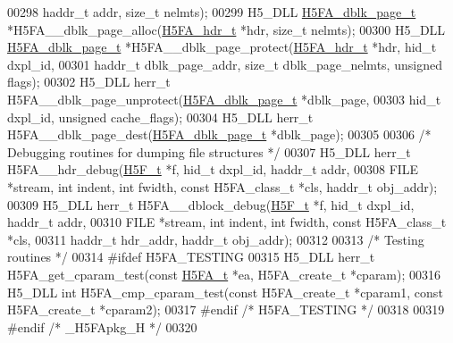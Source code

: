 \begin{DoxyCode}
00298     haddr\_t addr, \textcolor{keywordtype}{size\_t} nelmts);
00299 H5\_DLL \hyperlink{struct_h5_f_a__dbk__page__t}{H5FA\_dblk\_page\_t} *H5FA\_\_dblk\_page\_alloc(\hyperlink{struct_h5_f_a__hdr__t}{H5FA\_hdr\_t} *hdr, \textcolor{keywordtype}{size\_t} nelmts);
00300 H5\_DLL \hyperlink{struct_h5_f_a__dbk__page__t}{H5FA\_dblk\_page\_t} *H5FA\_\_dblk\_page\_protect(\hyperlink{struct_h5_f_a__hdr__t}{H5FA\_hdr\_t} *hdr, hid\_t dxpl\_id,
00301     haddr\_t dblk\_page\_addr, \textcolor{keywordtype}{size\_t} dblk\_page\_nelmts, \textcolor{keywordtype}{unsigned} flags);
00302 H5\_DLL herr\_t H5FA\_\_dblk\_page\_unprotect(\hyperlink{struct_h5_f_a__dbk__page__t}{H5FA\_dblk\_page\_t} *dblk\_page,
00303     hid\_t dxpl\_id, \textcolor{keywordtype}{unsigned} cache\_flags);
00304 H5\_DLL herr\_t H5FA\_\_dblk\_page\_dest(\hyperlink{struct_h5_f_a__dbk__page__t}{H5FA\_dblk\_page\_t} *dblk\_page);
00305 
00306 \textcolor{comment}{/* Debugging routines for dumping file structures */}
00307 H5\_DLL herr\_t H5FA\_\_hdr\_debug(\hyperlink{struct_h5_f__t}{H5F\_t} *f, hid\_t dxpl\_id, haddr\_t addr,
00308     FILE *stream, \textcolor{keywordtype}{int} indent, \textcolor{keywordtype}{int} fwidth, \textcolor{keyword}{const} H5FA\_class\_t *cls, haddr\_t obj\_addr);
00309 H5\_DLL herr\_t H5FA\_\_dblock\_debug(\hyperlink{struct_h5_f__t}{H5F\_t} *f, hid\_t dxpl\_id, haddr\_t addr,
00310     FILE *stream, \textcolor{keywordtype}{int} indent, \textcolor{keywordtype}{int} fwidth, \textcolor{keyword}{const} H5FA\_class\_t *cls,
00311     haddr\_t hdr\_addr, haddr\_t obj\_addr);
00312 
00313 \textcolor{comment}{/* Testing routines */}
00314 \textcolor{preprocessor}{#ifdef H5FA\_TESTING}
00315 H5\_DLL herr\_t H5FA\_get\_cparam\_test(\textcolor{keyword}{const} \hyperlink{struct_h5_f_a__t}{H5FA\_t} *ea, H5FA\_create\_t *cparam);
00316 H5\_DLL \textcolor{keywordtype}{int} H5FA\_cmp\_cparam\_test(\textcolor{keyword}{const} H5FA\_create\_t *cparam1, \textcolor{keyword}{const} H5FA\_create\_t *cparam2);
00317 \textcolor{preprocessor}{#endif }\textcolor{comment}{/* H5FA\_TESTING */}\textcolor{preprocessor}{}
00318 
00319 \textcolor{preprocessor}{#endif }\textcolor{comment}{/* \_H5FApkg\_H */}\textcolor{preprocessor}{}
00320 
\end{DoxyCode}
